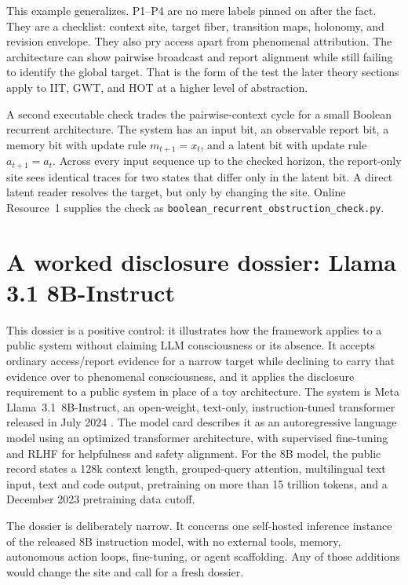 \documentclass[11pt]{article}
\begin{document}
This example generalizes. P1--P4 are no mere labels
pinned on after the fact. They are a checklist: context site, target fiber,
transition maps, holonomy, and revision envelope. They also pry access apart
from phenomenal attribution. The architecture can show pairwise broadcast and
report alignment while still failing to identify the global target. That is the
form of the test the later theory sections apply to IIT, GWT, and HOT at a higher
level of abstraction.

A second executable check trades the pairwise-context cycle for a small Boolean
recurrent architecture. The system has an input bit, an observable report bit, a
memory bit with update rule $m_{t+1}=x_t$, and a latent bit with update rule
$a_{t+1}=a_t$. Across every input sequence up to the checked horizon, the
report-only site sees identical traces for two states that differ only in the
latent bit. A direct latent reader resolves the target, but only by changing the
site. Online Resource~1 supplies the check as
\texttt{boolean\_recurrent\_obstruction\_check.py}.

\section{A worked disclosure dossier: Llama 3.1 8B-Instruct}
\label{sec:llama-dossier}

This dossier is a positive control: it illustrates how the framework
applies to a public system without claiming LLM consciousness or its
absence. It accepts ordinary access/report evidence for a narrow target
while declining to carry that evidence over to phenomenal consciousness,
and it applies the disclosure requirement to a public system in place of a
toy architecture. The system is Meta Llama~3.1~8B-Instruct,
an open-weight, text-only,
instruction-tuned transformer released in July 2024
\citep{grattafiori2024llama3,meta2024llama31card}.
The model card describes it as an autoregressive language model using an
optimized transformer architecture, with supervised fine-tuning and RLHF for
helpfulness and safety alignment.
For the 8B model, the public record states a 128k context length, grouped-query
attention, multilingual text input, text and code output, pretraining on more
than 15 trillion tokens, and a December 2023 pretraining data cutoff.

The dossier is deliberately narrow. It concerns one self-hosted inference
instance of the released 8B instruction model, with no external tools, memory,
autonomous action loops, fine-tuning, or agent scaffolding. Any of those
additions would change the site and call for a fresh dossier.
\end{document}
